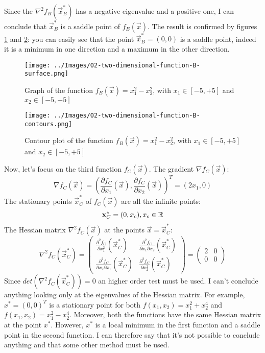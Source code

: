    Since the \(\nabla^2 f_B(\vec{x}_B^*)\) has a negative eigenvalue and a positive one, I can conclude that \(\vec{x}^*_B\) is a saddle point of \(f_B(\vec{x})\). The result is confirmed by figures \ref{two-dimensional-function-B-surface} and \ref{two-dimensional-function-B-contours}: you can easily see that the point \(\vec{x}_B^* = (0, 0)\) is a saddle point, indeed it is a minimum in one direction and a maximum in the other direction.\par
    \begin{figure}
        \centering
        \texttt{[image: ../Images/02-two-dimensional-function-B-surface.png]}
        \caption{Graph of the function \(f_B(\vec{x}) = x_{1}^{2} - x_{2}^{2}\), with \(x_1 \in [-5, +5]\) and \(x_2 \in [-5, +5]\)}
        \label{two-dimensional-function-B-surface}
    \end{figure}
    \begin{figure}
        \centering
        \texttt{[image: ../Images/02-two-dimensional-function-B-contours.png]}
        \caption{Contour plot of the function \(f_B(\vec{x}) = x_{1}^{2} - x_{2}^{2}\), with \(x_1 \in [-5, +5]\) and \(x_2 \in [-5, +5]\)}
        \label{two-dimensional-function-B-contours}
    \end{figure}
    Now, let's focus on the third function \(f_C(\vec{x})\). The gradient \(\nabla f_C(\vec{x})\):
    \[\nabla f_C(\vec{x}) = \left (\frac{\partial f_C}{\partial x_1}(\vec{x}), \frac{\partial f_C}{\partial x_2}(\vec{x}) \right )^T = (2x_1, 0)\]
    The stationary points \(\vec{x}_C^*\) of \(f_C(\vec{x})\) are all the infinite points:
    \[\mathbf{x}_C^* = (0, x_c), x_c \in \mathbb{R}\]
    The Hessian matrix \(\nabla^2 f_C(\vec{x})\) at the points \(\vec{x} = \vec{x}_C^*\):
    \[
        \nabla^2 f_C(\vec{x}_C^*) =
        \begin{pmatrix}
            \frac{\partial^2 f_C}{\partial x_1^2}(\vec{x}^*_C) &
            \frac{\partial^2 f_C}{\partial x_1 \partial x_2}(\vec{x}^*_C) \\
            \frac{\partial^2 f_C}{\partial x_2 \partial x_1}(\vec{x}^*_C) &
            \frac{\partial^2 f_C}{\partial x_2^2}(\vec{x}^*_C)
        \end{pmatrix}
        =
        \begin{pmatrix}
            2 & 0 \\
            0 & 0
        \end{pmatrix}
    \]
    Since \(det(\nabla^2 f_C(\vec{x}_C^*)) = 0\) an higher order test must be used. I can't conclude anything looking only at the eigenvalues of the Hessian matrix. For example, \(x^* = (0, 0)^T\) is a stationary point for both \(f(x_1, x_2) = x_1^2 + x_2^4\) and \(f(x_1, x_2) = x_1^2 - x_2^4\). Moreover, both the functions have the same Hessian matrix at the point \(x^*\). However, \(x^*\) is a local minimum in the first function and a saddle point in the second function. I can therefore say that it's not possible to conclude anything and that some other method must be used.\\
